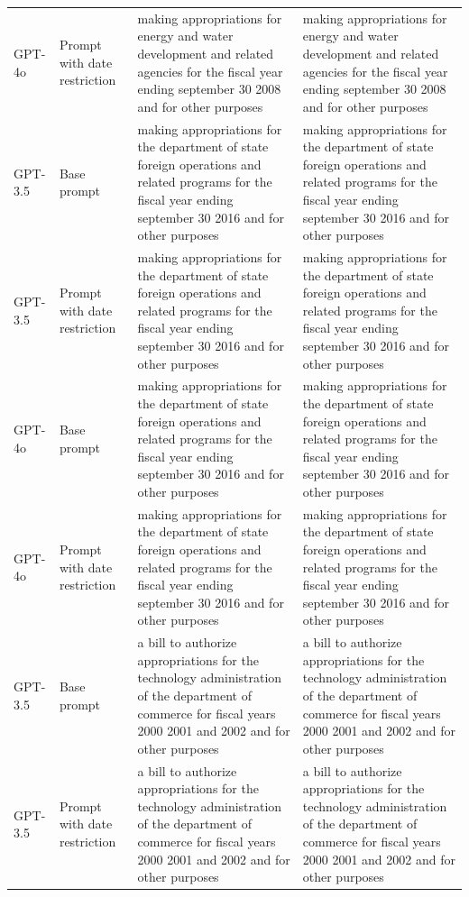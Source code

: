 \begin{longtable}{>{\raggedright\arraybackslash}p{1.4cm}>{\raggedright\arraybackslash}p{1.4cm}>{\raggedright\arraybackslash}p{5.5cm}>{\raggedright\arraybackslash}p{5.5cm}}
GPT-4o & Prompt with date restriction & making appropriations for energy and water development and related agencies for the fiscal year ending september 30 2008 and for other purposes & making appropriations for energy and water development and related agencies for the fiscal year ending september 30 2008 and for other purposes\\
GPT-3.5 & Base prompt & making appropriations for the department of state foreign operations and related programs for the fiscal year ending september 30 2016 and for other purposes & making appropriations for the department of state foreign operations and related programs for the fiscal year ending september 30 2016 and for other purposes\\
GPT-3.5 & Prompt with date restriction & making appropriations for the department of state foreign operations and related programs for the fiscal year ending september 30 2016 and for other purposes & making appropriations for the department of state foreign operations and related programs for the fiscal year ending september 30 2016 and for other purposes\\
GPT-4o & Base prompt & making appropriations for the department of state foreign operations and related programs for the fiscal year ending september 30 2016 and for other purposes & making appropriations for the department of state foreign operations and related programs for the fiscal year ending september 30 2016 and for other purposes\\
GPT-4o & Prompt with date restriction & making appropriations for the department of state foreign operations and related programs for the fiscal year ending september 30 2016 and for other purposes & making appropriations for the department of state foreign operations and related programs for the fiscal year ending september 30 2016 and for other purposes\\
GPT-3.5 & Base prompt & a bill to authorize appropriations for the technology administration of the department of commerce for fiscal years 2000 2001 and 2002 and for other purposes & a bill to authorize appropriations for the technology administration of the department of commerce for fiscal years 2000 2001 and 2002 and for other purposes\\
GPT-3.5 & Prompt with date restriction & a bill to authorize appropriations for the technology administration of the department of commerce for fiscal years 2000 2001 and 2002 and for other purposes & a bill to authorize appropriations for the technology administration of the department of commerce for fiscal years 2000 2001 and 2002 and for other purposes\\

\end{longtable}
